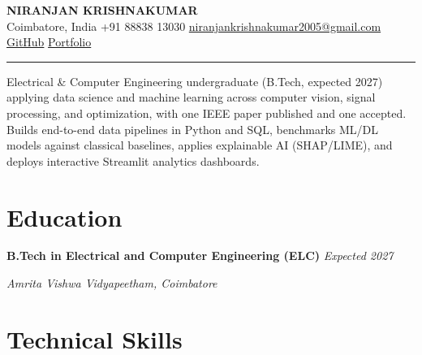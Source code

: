 \documentclass[10pt]{article}
\newcommand{\heading}[2]{%
    \noindent
    \textbf{#1}
    \hfill
    \textit{\small #2}
    \par
    \vspace{1pt}
}
\begin{document}
\begin{center}

{\Large\bfseries NIRANJAN KRISHNAKUMAR}\\[3pt]

{\small
Coimbatore, India
\enspace\textbullet\enspace
+91 88838 13030
\enspace\textbullet\enspace
\href{mailto:niranjankrishnakumar2005@gmail.com}
{niranjankrishnakumar2005@gmail.com}
\enspace\textbullet\enspace
\href{https://github.com/niranjan-crypt}{GitHub}
\enspace\textbullet\enspace
\href{https://niranjan-crypt.github.io}{Portfolio}
}

\end{center}

\vspace{-2pt}
\hrule
\vspace{4pt}

{\small\justifying
Electrical \& Computer Engineering undergraduate (B.Tech, expected 2027) applying data science and machine learning across computer vision, signal processing, and optimization, with one IEEE paper published and one accepted. Builds end-to-end data pipelines in Python and SQL, benchmarks ML/DL models against classical baselines, applies explainable AI (SHAP/LIME), and deploys interactive Streamlit analytics dashboards.
\par}

\section{Education}

\heading
{B.Tech in Electrical and Computer Engineering (ELC)}
{Expected 2027}

{\small
\textit{Amrita Vishwa Vidyapeetham, Coimbatore}
}

\section{Technical Skills}
\end{document}
